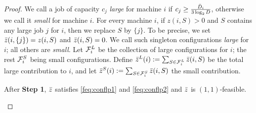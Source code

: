 \begin{proof}
		We call a job of capacity $c_j$ {\em large} for machine $i$ if $c_j \geq \frac{\bar{D}_i}{3\log_2 D}$, otherwise we call it \emph{small} for machine $i$.
%	
%		
%
%				
%
For every machine $i$, if $z(i,S) > 0$ and $S$ contains any large job $j$ for $i$, then we replace $S$ by $\{j\}$. To be precise, we set $\bar z(i,\{j\}) = z(i,S)$ and $\bar z(i,S) = 0$.
We call such singleton configurations {\em large} for $i$; all others are {\em small}. %
Let ${\cal F}^L_i$ be the collection of large configurations for $i$; the rest ${\cal F}^S_i$ being small configurations.
Define $\bar z^L(i) := \sum_{S\in {\cal F}^L_i} \bar z(i,S)$ be the total large contribution to $i$, and let $\bar z^S(i) := \sum_{S\in {\cal F}^S_i} \bar z(i,S)$ the small contribution.

\begin{claim}\label{fclm:step1}
	After {\bf Step 1}, $\bar z$ satisfies \eqref{feq:conflp1} and \eqref{feq:conflp2} and $\bar z$ is $(1,1)$-feasible.
\end{claim}

 	
	
%	


\end{proof}
